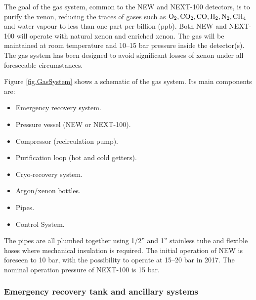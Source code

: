 The goal of the gas system, common to the NEW and NEXT-100 detectors, is to purify the xenon, reducing the traces of gases such as ${\rm O_2, CO_2,CO, H_2, N_2, CH_4}$ and water vapour to less than one part per billion (ppb). Both NEW and NEXT-100 will operate with natural xenon and enriched xenon. The gas will be maintained at room temperature and 10--15 bar pressure inside the detector(s). The gas system has been designed to avoid significant losses of xenon under all foreseeable circumstances.


Figure \ref{fig.GasSystem} shows a schematic of the gas system. Its main components are:  

\begin{itemize}
\item Emergency recovery system.
\item Pressure vessel (NEW or NEXT-100). 
\item Compressor (recirculation pump).
\item Purification loop (hot and cold getters).
\item Cryo-recovery system.
\item Argon/xenon bottles.
\item Pipes.
\item Control System.
\end{itemize}

The pipes are all plumbed together using 1/2'' and 1'' stainless tube and flexible hoses where mechanical insulation is required. The initial operation of NEW is foreseen to 10 bar, with the possibility to operate at 15--20 bar in 2017. The nominal operation pressure of NEXT-100 is 15 bar. 

\subsubsection*{Emergency recovery tank and ancillary systems}

